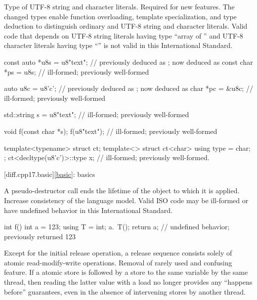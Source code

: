 \change
Type of UTF-8 string and character literals.
\rationale
Required for new features.
The changed types enable function overloading, template specialization, and
type deduction to distinguish ordinary and UTF-8 string and character literals.
\effect
Valid \CppXVII{} code that depends on
UTF-8 string literals having type ``array of '' and
UTF-8 character literals having type ``''
is not valid in this International Standard.
\begin{codeblock}
const auto *u8s = u8"text";     //  previously deduced as ; now deduced as 
const char *ps = u8s;           // ill-formed; previously well-formed

auto u8c = u8'c';               //  previously deduced as ; now deduced as 
char *pc = &u8c;                // ill-formed; previously well-formed

std::string s = u8"text";       // ill-formed; previously well-formed

void f(const char *s);
f(u8"text");                    // ill-formed; previously well-formed

template<typename> struct ct;
template<> struct ct<char> {
  using type = char;
};
ct<decltype(u8'c')>::type x;    // ill-formed; previously well-formed.
\end{codeblock}

[diff.cpp17.basic]{\ref{basic}: basics}

\change
A pseudo-destructor call ends the lifetime of
the object to which it is applied.
\rationale
Increase consistency of the language model.
\effect
Valid ISO \CppXVII{} code may be ill-formed or
have undefined behavior in this International Standard.
\begin{example}
\begin{codeblock}
int f() {
  int a = 123;
  using T = int;
  a.~T();
  return a;         // undefined behavior; previously returned 123
}
\end{codeblock}
\end{example}

\change
Except for the initial release operation,
a release sequence consists solely of atomic read-modify-write operations.
\rationale
Removal of rarely used and confusing feature.
\effect
If a  atomic store is followed
by a  store to the same variable by the same thread,
then reading the latter value with a  load
no longer provides any ``happens before'' guarantees,
even in the absence of intervening stores by another thread.

